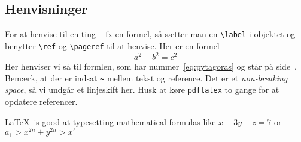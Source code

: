 \documentclass[a4,12pt]{article}
\numberwithin{equation}{section}
\begin{document}
\subsection{Henvisninger}
For at henvise til en ting -- fx en formel, så sætter man en \verb$\label$ i objektet og benytter \verb$\ref$ og \verb$\pageref$ til at henvise. Her er en formel
\begin{equation}
  a^2 + b^2 = c^2
  \label{eq:pytagoras}
\end{equation}
Her henviser vi så til formlen, som har nummer~\ref{eq:pytagoras} og står på side~\pageref{eq:pytagoras}. Bemærk, at der er indsat \verb$~$ mellem tekst og reference. Det er et \emph{non-breaking space}, så vi undgår et linjeskift her. Husk at køre \verb$pdflatex$ to gange for at opdatere referencer.

\LaTeX\ is good at typesetting mathematical formulas
like
       \( x-3y + z = 7 \) 
or
       \( a_{1} > x^{2n} + y^{2n} > x' \)

\end{document}
